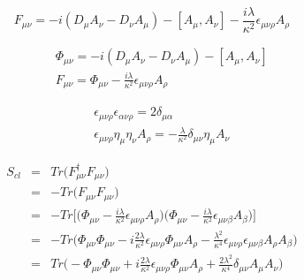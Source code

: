 \documentclass[10pt]{book}
\theoremstyle{break}
\begin{document}
\begin{equation*}
 F_{\mu \nu} = -i ( D_{\mu} A_{\nu}  -  D_{\nu} A_{\mu} ) - [ A_{\mu} , A_{\nu} ] - \frac{i\lambda }{\kappa^{2}} \epsilon_{\mu \nu \rho} A_{\rho} 
\end{equation*}


\begin{eqnarray*}
 && \Phi_{\mu \nu} = - i ( D_{\mu} A_{\nu}  -  D_{\nu} A_{\mu} ) - [ A_{\mu} , A_{\nu} ] \\
 && F_{\mu \nu} = \Phi_{\mu \nu} - \frac{i \lambda }{\kappa^{2}} \epsilon_{\mu \nu \rho} A_{\rho}
\end{eqnarray*}


\begin{eqnarray*}
 && \epsilon_{\mu \nu \rho} \epsilon_{\alpha \nu \rho} = 2 \delta_{\mu \alpha} \\
 && \epsilon_{\mu \nu \rho} \eta_\mu \eta_\nu A_\rho = - \frac{\lambda}{\kappa^2} \delta_{\mu \nu} \eta_\mu A_\nu 
\end{eqnarray*}



\begin{eqnarray*}
 S_{cl} &=& Tr\big( F_{\mu \nu}^{\dagger} F_{\mu \nu} \big) \nonumber \\
        &=& - Tr\big( F_{\mu \nu} F_{\mu \nu} \big) \nonumber \\
        &=& - Tr\Big[ \bigg( \Phi_{\mu \nu} - \frac{i \lambda }{\kappa^{2}} \epsilon_{\mu \nu \rho} A_{\rho} \bigg) \bigg( \Phi_{\mu \nu} - \frac{i \lambda }{\kappa^{2}} \epsilon_{\mu \nu \beta} A_{\beta} \bigg) \Big] \nonumber \\
        &=& - Tr\bigg( \Phi_{\mu \nu} \Phi_{\mu \nu} - i \frac{2\lambda}{\kappa^2} \epsilon_{\mu \nu \rho} \Phi_{\mu \nu} A_{\rho} - \frac{\lambda^2}{\kappa^4} \epsilon_{\mu \nu \rho} \epsilon_{\mu \nu \beta} A_{\rho} A_{\beta} \bigg) \nonumber \\
        &=& Tr\bigg( - \Phi_{\mu \nu} \Phi_{\mu \nu} + i \frac{2\lambda}{\kappa^2} \epsilon_{\mu \nu \rho} \Phi_{\mu \nu} A_{\rho} + \frac{2\lambda^2}{\kappa^4} \delta_{\mu \nu} A_{\mu} A_{\nu} \bigg)
\end{eqnarray*}
\end{document}
